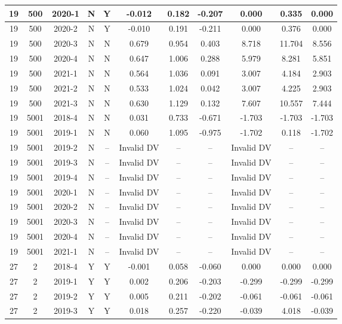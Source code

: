 \begin{landscape}
\begin{longtable}{@{}ccccc|ccc|ccc@{}}
19 & 500 & 2020-1 & N & Y & -0.012 & 0.182 & -0.207 & 0.000 & 0.335 & 0.000 \\* \midrule
19 & 500 & 2020-2 & N & Y & -0.010 & 0.191 & -0.211 & 0.000 & 0.376 & 0.000 \\* \midrule
19 & 500 & 2020-3 & N & N & 0.679 & 0.954 & 0.403 & 8.718 & 11.704 & 8.556 \\* \midrule
19 & 500 & 2020-4 & N & N & 0.647 & 1.006 & 0.288 & 5.979 & 8.281 & 5.851 \\* \midrule
19 & 500 & 2021-1 & N & N & 0.564 & 1.036 & 0.091 & 3.007 & 4.184 & 2.903 \\* \midrule
19 & 500 & 2021-2 & N & N & 0.533 & 1.024 & 0.042 & 3.007 & 4.225 & 2.903 \\* \midrule
19 & 500 & 2021-3 & N & N & 0.630 & 1.129 & 0.132 & 7.607 & 10.557 & 7.444 \\* \midrule
19 & 5001 & 2018-4 & N & N & 0.031 & 0.733 & -0.671 & -1.703 & -1.703 & -1.703 \\* \midrule
19 & 5001 & 2019-1 & N & N & 0.060 & 1.095 & -0.975 & -1.702 & 0.118 & -1.702 \\* \midrule
19 & 5001 & 2019-2 & N & -- & Invalid DV & -- & -- & Invalid DV & -- & -- \\* \midrule
19 & 5001 & 2019-3 & N & -- & Invalid DV & -- & -- & Invalid DV & -- & -- \\* \midrule
19 & 5001 & 2019-4 & N & -- & Invalid DV & -- & -- & Invalid DV & -- & -- \\* \midrule
19 & 5001 & 2020-1 & N & -- & Invalid DV & -- & -- & Invalid DV & -- & -- \\* \midrule
19 & 5001 & 2020-2 & N & -- & Invalid DV & -- & -- & Invalid DV & -- & -- \\* \midrule
19 & 5001 & 2020-3 & N & -- & Invalid DV & -- & -- & Invalid DV & -- & -- \\* \midrule
19 & 5001 & 2020-4 & N & -- & Invalid DV & -- & -- & Invalid DV & -- & -- \\* \midrule
19 & 5001 & 2021-1 & N & -- & Invalid DV & -- & -- & Invalid DV & -- & -- \\* \midrule
27 & 2 & 2018-4 & Y & Y & -0.001 & 0.058 & -0.060 & 0.000 & 0.000 & 0.000 \\* \midrule
27 & 2 & 2019-1 & Y & Y & 0.002 & 0.206 & -0.203 & -0.299 & -0.299 & -0.299 \\* \midrule
27 & 2 & 2019-2 & Y & Y & 0.005 & 0.211 & -0.202 & -0.061 & -0.061 & -0.061 \\* \midrule
27 & 2 & 2019-3 & Y & Y & 0.018 & 0.257 & -0.220 & -0.039 & 4.018 & -0.039 \\* \midrule

\end{longtable}
\end{landscape}
